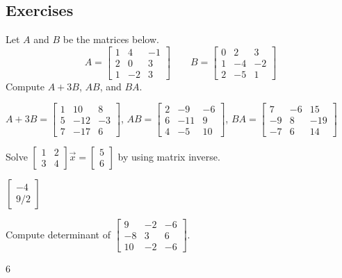 \subsection{Exercises}

\begin{exercise}
Let $A$ and $B$ be the matrices below.
\[ A = \begin{bmatrix} 1 & 4 & -1 \\ 2 & 0 & 3 \\
1 & -2 & 3 \end{bmatrix} \qquad B = \begin{bmatrix} 0 & 2 & 3 \\ 1 & -4 & -2 \\ 2 & -5 & 1 \end{bmatrix} \]
Compute $A + 3B$, $AB$, and $BA$. 
\end{exercise}
\comboSol{%
}
{%
$A+3B = \left[\begin{smallmatrix} 1 & 10 & 8 \\ 5 & -12 & -3 \\ 7 & -17 & 6 \end{smallmatrix}\right]$, $AB = \left[\begin{smallmatrix}  2 & -9 & -6 \\ 6 & -11 & 9 \\ 4 & -5 & 10 \end{smallmatrix}\right]$, $BA = \left[\begin{smallmatrix} 7 & -6 & 15 \\ -9 & 8 & -19 \\ -7 & 6 & 14 \end{smallmatrix}\right]$
}

\begin{exercise}
Solve
$\left[ \begin{smallmatrix}
1 & 2 \\
3 & 4 
\end{smallmatrix} \right] \vec{x} =
\left[ \begin{smallmatrix}
5 \\
6
\end{smallmatrix} \right]$ by using matrix inverse.
\end{exercise}
\comboSol{%
}
{%
$\left[\begin{smallmatrix} -4 \\ 9/2 \end{smallmatrix}\right]$
}

\begin{exercise}
Compute determinant of
$\left[ \begin{smallmatrix}
9 & -2 & -6 \\
-8 & 3 & 6 \\
10 & -2 & -6
\end{smallmatrix} \right]$.
\end{exercise}
\comboSol{%
}
{%
6
}

